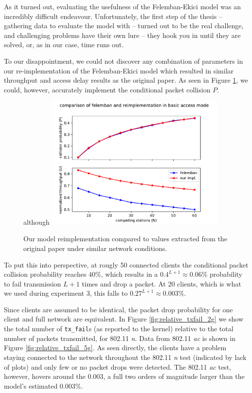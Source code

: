 As it turned out, evaluating the usefulness of the Felemban-Ekici model was an
incredibly difficult endeavour. Unfortunately, the first step of the thesis --
gathering data to evaluate the model with -- turned out to be the real
challenge, and challenging problems have their own lure -- they hook you in
until they are solved, or, as in our case, time runs out.

To our disappointment, we could not discover any combination of parameters in
our re-implementation of the Felemban-Ekici model which resulted in similar
throughput and access delay results as the original paper. As seen in Figure
\ref{fig:modelimpl}, we could, however, accurately implement the conditional
packet collision $P$.

\begin{figure}[tbp]although
  \centering
  \includegraphics[width=0.8\textwidth]{images/reimpl.pdf}
  \caption{Our model reimplementation compared to values extracted from the original paper under similar network conditions.}
  \label{fig:modelimpl}
\end{figure}

To put this into perspective, at rougly 50 connected clients the conditional
packet collision probability reaches $40\%$, which results in a $0.4^{L+1}
\approx 0.06\%$ probability to fail transmission $L+1$ times and drop a
packet. At 20 clients, which is what we used during experiment 3, this falls
to $0.27^{L+1} \approx 0.003\%$.

Since clients are assumed to be identical, the packet drop probability for one
client and full network are equivalent. In Figure \ref{fig:relative_txfail_2g}
we show the total number of \texttt{tx\_fail}s (as reported to the kernel)
relative to the total number of packets transmitted, for 802.11 \emph{n}. Data
from 802.11 \emph{ac} is shown in Figure \ref{fig:relative_txfail_5g}. As seen
directly, the clients have a problem staying connected to the network throughout
the 802.11 \emph{n} test (indicated by lack of plots) and only few or no
packet drops were detected. The 802.11 \emph{ac} test, however, hovers around
the $0.003$, a full two orders of magnitude larger than the model's estimated
$0.003\%$.

